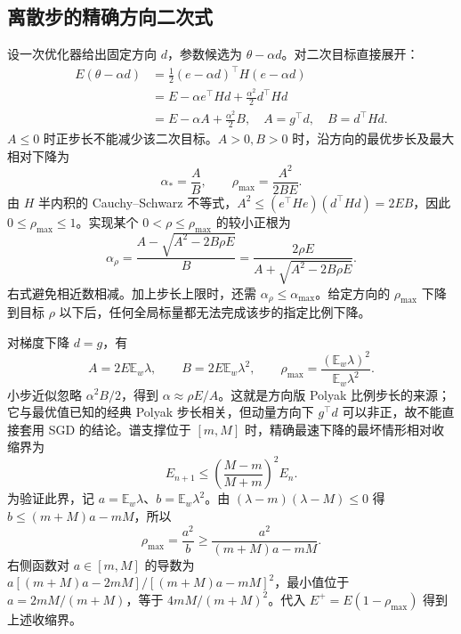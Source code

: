 \documentclass[lang=cn,scheme=chinese,openany]{../book/elegantbook}
\newcommand{\E}{\mathbb E}
\begin{document}
\subsection{离散步的精确方向二次式}

设一次优化器给出固定方向 $d$，参数候选为 $\theta-\alpha d$。对二次目标直接展开：
\begin{align}
E(\theta-\alpha d)
&=\frac12(e-\alpha d)^\top H(e-\alpha d)\\
&=E-\alpha e^\top Hd+\frac{\alpha^2}2d^\top Hd\\
&=E-\alpha A+\frac{\alpha^2}2B,
\quad A=g^\top d,\quad B=d^\top Hd.
\label{dyn:scalar-ray}
\end{align}
$A\le0$ 时正步长不能减少该二次目标。$A>0,B>0$ 时，沿方向的最优步长及最大相对下降为
\begin{equation}
\alpha_*=\frac AB,\qquad
\rho_{\max}=\frac{A^2}{2BE}.
\end{equation}
由 $H$ 半内积的 Cauchy--Schwarz 不等式，$A^2\le(e^\top He)(d^\top Hd)=2EB$，因此 $0\le\rho_{\max}\le1$。实现某个 $0<\rho\le\rho_{\max}$ 的较小正根为
\begin{equation}
\alpha_\rho=\frac{A-\sqrt{A^2-2B\rho E}}B
=\frac{2\rho E}{A+\sqrt{A^2-2B\rho E}}.
\end{equation}
右式避免相近数相减。加上步长上限时，还需 $\alpha_\rho\le\alpha_{\max}$。给定方向的 $\rho_{\max}$ 下降到目标 $\rho$ 以下后，任何全局标量都无法完成该步的指定比例下降。

对梯度下降 $d=g$，有
\begin{equation}
A=2E\E_w\lambda,\qquad B=2E\E_w\lambda^2,\qquad
\rho_{\max}=\frac{(\E_w\lambda)^2}{\E_w\lambda^2}.
\end{equation}
小步近似忽略 $\alpha^2B/2$，得到 $\alpha\approx\rho E/A$。这就是方向版 Polyak 比例步长的来源；它与最优值已知的经典 Polyak 步长相关，但动量方向下 $g^\top d$ 可以非正，故不能直接套用 SGD 的结论。谱支撑位于 $[m,M]$ 时，精确最速下降的最坏情形相对收缩界为
\begin{equation}
E_{n+1}\le\left(\frac{M-m}{M+m}\right)^2E_n.
\end{equation}
为验证此界，记 $a=\E_w\lambda$、$b=\E_w\lambda^2$。由 $(\lambda-m)(\lambda-M)\le0$ 得 $b\le(m+M)a-mM$，所以
\begin{equation}
\rho_{\max}=\frac{a^2}{b}\ge\frac{a^2}{(m+M)a-mM}.
\end{equation}
右侧函数对 $a\in[m,M]$ 的导数为 $a[(m+M)a-2mM]/[(m+M)a-mM]^2$，最小值位于 $a=2mM/(m+M)$，等于 $4mM/(m+M)^2$。代入 $E^+=E(1-\rho_{\max})$ 得到上述收缩界。
\end{document}

